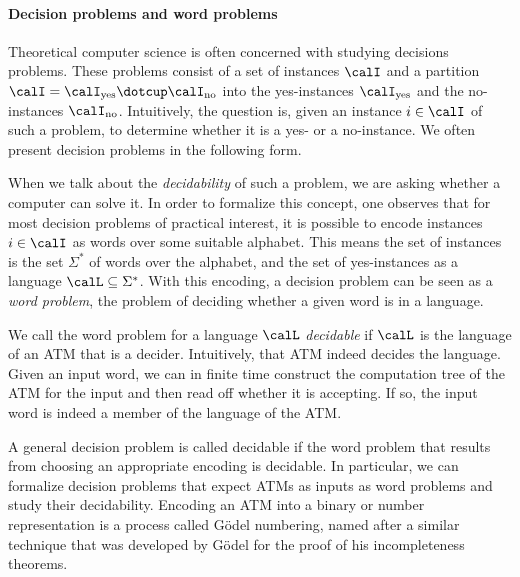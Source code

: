 \documentclass[../../diss.tex]{subfiles}
\begin{document}
\paragraph{Decision problems and word problems}

Theoretical computer science is often concerned with studying decisions problems.
These problems consist of a set of instances $\calI$ and a partition $\calI = \calI_{\text{yes}} \dotcup \calI_{\text{no}}$ into the yes-instances $\calI_{\text{yes}}$ and the no-instances $\calI_{\text{no}}$.
Intuitively, the question is, given an instance $i \in \calI$ of such a problem, to determine whether it is a yes- or a no-instance.
We often present decision problems in the following form.

\begin{problem}
\end{problem}

When we talk about the \emph{decidability} of such a problem, we are asking whether a computer can solve it.
In order to formalize this concept, one observes that for most decision problems of practical interest, it is possible to encode instances $i \in \calI$ as words over some suitable alphabet.
This means the set of instances is the set $\Sigma^*$ of words over the alphabet, and the set of yes-instances as a language $\calL \subseteq \Sigma^*$.
With this encoding, a decision problem can be seen as a \emph{word problem}, the problem of deciding whether a given word is in a language.

\begin{problem}
\end{problem}

We call the word problem for a language $\calL$ \emph{decidable} if $\calL$ is the language of an ATM that is a decider.
Intuitively, that ATM indeed decides the language.
Given an input word, we can in finite time construct the computation tree of the ATM for the input and then read off whether it is accepting.
If so, the input word is indeed a member of the language of the ATM.\@

A general decision problem is called decidable if the word problem that results from choosing an appropriate encoding is decidable.
In particular, we can formalize decision problems that expect ATMs as inputs as word problems and study their decidability.
Encoding an ATM into \eg a binary or number representation is a process called Gödel numbering, named after a similar technique that was developed by Gödel for the proof of his incompleteness theorems.
\end{document}
